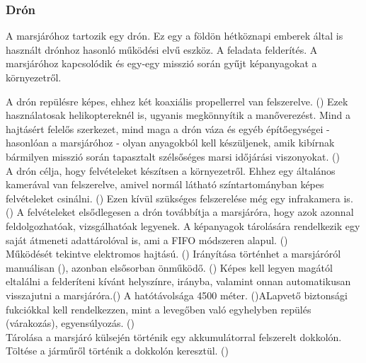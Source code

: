 \documentclass[12pt]{report}
\begin{document}
\subsubsection{Drón}

A marsjáróhoz tartozik egy drón. Ez egy a földön hétköznapi emberek által is használt drónhoz hasonló működési elvű eszköz. A feladata felderítés. A marsjáróhoz kapcsolódik és egy-egy misszió során gyűjt képanyagokat a környezetről.

A drón repülésre képes, ehhez két koaxiális propellerrel van felszerelve. () Ezek használatosak helikoptereknél is, ugyanis megkönnyítik a manőverezést. Mind a hajtásért felelős szerkezet, mind maga a drón váza és egyéb építőegységei - hasonlóan a marsjáróhoz - olyan anyagokból kell készüljenek, amik kibírnak bármilyen misszió során tapasztalt szélsőséges marsi időjárási viszonyokat. ()\\

A drón célja, hogy felvételeket készítsen a környezetről. Ehhez egy általános kamerával van felszerelve, amivel normál látható színtartományban képes felvételeket csinálni. () Ezen kívül szükséges felszerelése még egy infrakamera is. () A felvételeket elsődlegesen a drón továbbítja a marsjáróra, hogy azok azonnal feldolgozhatóak, vizsgálhatóak legyenek. A képanyagok tárolására rendelkezik egy saját átmeneti adattárolóval is, ami a FIFO módszeren alapul. ()\\

Működését tekintve elektromos hajtású. () Irányítása történhet a marsjáróról manuálisan (), azonban elsősorban önműködő. () Képes kell legyen magától eltalálni a felderíteni kívánt helyszínre, irányba, valamint onnan automatikusan visszajutni a marsjáróra.() A hatótávolsága 4500 méter. ()ALapvető biztonsági fukciókkal kell rendelkezzen, mint a levegőben való egyhelyben repülés (várakozás), egyensúlyozás. ()\\

Tárolása a marsjáró külsején történik egy akkumulátorral felszerelt dokkolón. Töltése a járműről történik a dokkolón keresztül. ()
\end{document}
